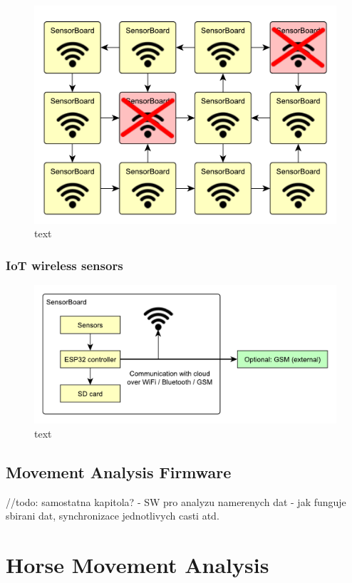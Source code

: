 \begin{figure}[H]
	\centering
	\label{UELogging1}
	\caption{text}
	\includegraphics[width=16cm]{img/UsageExamplesGrid.pdf}
\end{figure}

\subsection{IoT wireless sensors}

\begin{figure}[H]
	\centering
	\label{UELogging1}
	\caption{text}
	\includegraphics[width=16cm]{img/UsageExamplesIoT.pdf}
\end{figure}

\section{Movement Analysis Firmware}
//todo: samostatna kapitola?
- SW pro analyzu namerenych dat
- jak funguje sbirani dat, synchronizace jednotlivych casti atd.

\chapter{Horse Movement Analysis}